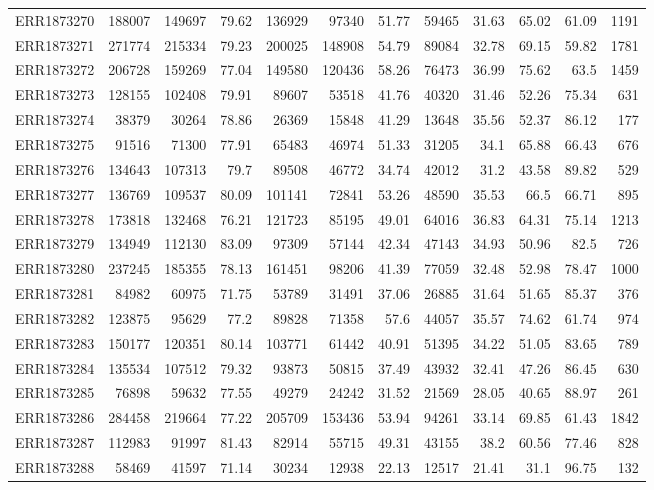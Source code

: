\documentclass[12pt, oneside]{report}
\begin{document}
\begin{longtable}{@{}p{3.2cm}rrrrrrrrrrr@{}}
ERR1873270 & 188007 & 149697 & 79.62 & 136929 & 97340 & 51.77 & 59465 & 31.63 & 65.02 & 61.09 & 1191 \\
ERR1873271 & 271774 & 215334 & 79.23 & 200025 & 148908 & 54.79 & 89084 & 32.78 & 69.15 & 59.82 & 1781 \\
ERR1873272 & 206728 & 159269 & 77.04 & 149580 & 120436 & 58.26 & 76473 & 36.99 & 75.62 & 63.5 & 1459 \\
ERR1873273 & 128155 & 102408 & 79.91 & 89607 & 53518 & 41.76 & 40320 & 31.46 & 52.26 & 75.34 & 631 \\
ERR1873274 & 38379 & 30264 & 78.86 & 26369 & 15848 & 41.29 & 13648 & 35.56 & 52.37 & 86.12 & 177 \\
ERR1873275 & 91516 & 71300 & 77.91 & 65483 & 46974 & 51.33 & 31205 & 34.1 & 65.88 & 66.43 & 676 \\
ERR1873276 & 134643 & 107313 & 79.7 & 89508 & 46772 & 34.74 & 42012 & 31.2 & 43.58 & 89.82 & 529 \\
ERR1873277 & 136769 & 109537 & 80.09 & 101141 & 72841 & 53.26 & 48590 & 35.53 & 66.5 & 66.71 & 895 \\
ERR1873278 & 173818 & 132468 & 76.21 & 121723 & 85195 & 49.01 & 64016 & 36.83 & 64.31 & 75.14 & 1213 \\
ERR1873279 & 134949 & 112130 & 83.09 & 97309 & 57144 & 42.34 & 47143 & 34.93 & 50.96 & 82.5 & 726 \\
ERR1873280 & 237245 & 185355 & 78.13 & 161451 & 98206 & 41.39 & 77059 & 32.48 & 52.98 & 78.47 & 1000 \\
ERR1873281 & 84982 & 60975 & 71.75 & 53789 & 31491 & 37.06 & 26885 & 31.64 & 51.65 & 85.37 & 376 \\
ERR1873282 & 123875 & 95629 & 77.2 & 89828 & 71358 & 57.6 & 44057 & 35.57 & 74.62 & 61.74 & 974 \\
ERR1873283 & 150177 & 120351 & 80.14 & 103771 & 61442 & 40.91 & 51395 & 34.22 & 51.05 & 83.65 & 789 \\
ERR1873284 & 135534 & 107512 & 79.32 & 93873 & 50815 & 37.49 & 43932 & 32.41 & 47.26 & 86.45 & 630 \\
ERR1873285 & 76898 & 59632 & 77.55 & 49279 & 24242 & 31.52 & 21569 & 28.05 & 40.65 & 88.97 & 261 \\
ERR1873286 & 284458 & 219664 & 77.22 & 205709 & 153436 & 53.94 & 94261 & 33.14 & 69.85 & 61.43 & 1842 \\
ERR1873287 & 112983 & 91997 & 81.43 & 82914 & 55715 & 49.31 & 43155 & 38.2 & 60.56 & 77.46 & 828 \\
ERR1873288 & 58469 & 41597 & 71.14 & 30234 & 12938 & 22.13 & 12517 & 21.41 & 31.1 & 96.75 & 132 \\

\end{longtable}
\end{document}
